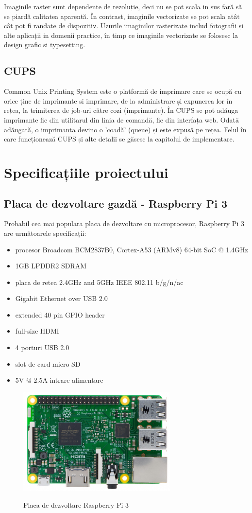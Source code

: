 \documentclass[a4paper, 12pt, twoside]{report}
\begin{document}
Imaginile raster sunt dependente de rezoluție, deci nu se pot scala in sus fară să se piardă calitatea aparentă. În contrast, imaginile vectorizate se pot scala atât cât pot fi randate de dispozitiv. Uzurile imaginilor rasterizate includ fotografii și alte aplicații in domenii practice, în timp ce imaginile vectorizate se folosesc la design grafic si typesetting.

	\section{CUPS}
Common Unix Printing System este o platformă de imprimare care se ocupă cu orice ține de imprimante si imprimare, de la administrare și expunerea lor în rețea, la trimiterea de job-uri către cozi (imprimante). În CUPS se pot adăuga imprimante fie din utilitarul din linia de comandă, fie din interfața web. Odată adăugată, o imprimanta devino o 'coadă' (queue) și este expusă pe rețea. Felul în care funcționează CUPS și alte detalii se găsesc la capitolul de implementare.

\chapter{Specificațiile proiectului}
	\section{Placa de dezvoltare gazdă - Raspberry Pi 3}
Probabil cea mai populara placa de dezvoltare cu microprocesor, Raspberry Pi 3 are următoarele specificații:
\begin{itemize}
\item procesor Broadcom BCM2837B0, Cortex-A53 (ARMv8) 64-bit SoC @ 1.4GHz
\item 1GB LPDDR2 SDRAM
\item placa de retea 2.4GHz and 5GHz IEEE 802.11 b/g/n/ac
\item Gigabit Ethernet over USB 2.0
\item extended 40 pin GPIO header
\item full-size HDMI
\item 4 porturi USB 2.0
\item slot de card micro SD
\item 5V @ 2.5A intrare alimentare
\end{itemize}

\begin{figure}
		\centering
			{\includegraphics[width=80mm]{rpi.png}}
		\caption{Placa de dezvoltare Raspberry Pi 3}
\end{figure}
\end{document}
